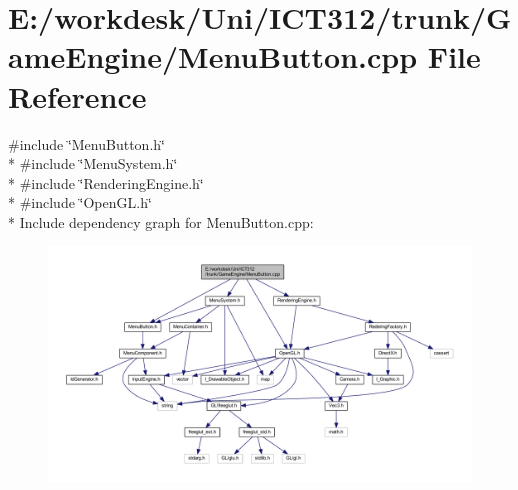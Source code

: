 \section{E\+:/workdesk/\+Uni/\+I\+C\+T312/trunk/\+Game\+Engine/\+Menu\+Button.cpp File Reference}
\label{_menu_button_8cpp}
{\ttfamily \#include \char`\"{}Menu\+Button.\+h\char`\"{}}\\*
{\ttfamily \#include \char`\"{}Menu\+System.\+h\char`\"{}}\\*
{\ttfamily \#include \char`\"{}Rendering\+Engine.\+h\char`\"{}}\\*
{\ttfamily \#include \char`\"{}Open\+G\+L.\+h\char`\"{}}\\*
Include dependency graph for Menu\+Button.\+cpp\+:\nopagebreak
\begin{figure}[H]
\begin{center}
\leavevmode
\includegraphics[width=350pt]{d2/dd4/_menu_button_8cpp__incl}
\end{center}
\end{figure}
